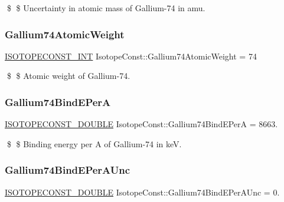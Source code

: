 \$ \$ Uncertainty in atomic mass of Gallium-\/74 in amu. \mbox{\label{group___isotope_const-_gallium-_ga74_gac7ca69056e1a7c8c61664c46225fe888}} 
\subsubsection{\texorpdfstring{Gallium74\+Atomic\+Weight}{Gallium74AtomicWeight}}
{\footnotesize\ttfamily \mbox{\hyperlink{group___isotope_const-_macros_ga5f18360b3e99483a35c32d789e62621c}{I\+S\+O\+T\+O\+P\+E\+C\+O\+N\+S\+T\+\_\+\+I\+NT}} Isotope\+Const\+::\+Gallium74\+Atomic\+Weight = 74}

\$ \$ Atomic weight of Gallium-\/74. \mbox{\label{group___isotope_const-_gallium-_ga74_gac5de04cbe03961bf04b3c1a0cc9c8fef}} 
\subsubsection{\texorpdfstring{Gallium74\+Bind\+E\+PerA}{Gallium74BindEPerA}}
{\footnotesize\ttfamily \mbox{\hyperlink{group___isotope_const-_macros_ga8f45a7272ce02c0b4c65c44636ed719a}{I\+S\+O\+T\+O\+P\+E\+C\+O\+N\+S\+T\+\_\+\+D\+O\+U\+B\+LE}} Isotope\+Const\+::\+Gallium74\+Bind\+E\+PerA = 8663.}

\$ \$ Binding energy per A of Gallium-\/74 in keV. \mbox{\label{group___isotope_const-_gallium-_ga74_ga9b82d7269a7ff8088937686b723cb2a9}} 
\subsubsection{\texorpdfstring{Gallium74\+Bind\+E\+Per\+A\+Unc}{Gallium74BindEPerAUnc}}
{\footnotesize\ttfamily \mbox{\hyperlink{group___isotope_const-_macros_ga8f45a7272ce02c0b4c65c44636ed719a}{I\+S\+O\+T\+O\+P\+E\+C\+O\+N\+S\+T\+\_\+\+D\+O\+U\+B\+LE}} Isotope\+Const\+::\+Gallium74\+Bind\+E\+Per\+A\+Unc = 0.}


